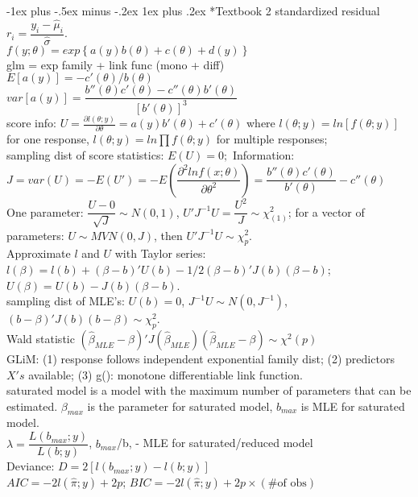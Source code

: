 \documentclass[10pt,landscape]{article}
\makeatletter
\renewcommand{\subsubsection}{\@startsection{subsubsection}{3}{0mm}%
                                {-1ex plus -.5ex minus -.2ex}%
                                {1ex plus .2ex}%
                                {\normalfont\small\bfseries}}
\makeatother
\begin{document}
\begin{multicols}{3}
\subsubsection*{Textbook 2}
\vspace{-5pt}
standardized residual $r_{i}=\dfrac{y_{i}-\hat{\mu}_{i}}{\hat{\sigma}}$. \\
$f\left(y;\theta\right)=exp\left\{ a\left(y\right)b\left(\theta\right)+c\left(\theta\right)+d\left(y\right)\right\} $ \\
glm = exp family + link func (mono + diff)  \\
$E\left[a\left(y\right)\right]=-c'\left(\theta\right)/b\left(\theta\right)$ \\
$var\left[a\left(y\right)\right]=\dfrac{b''\left(\theta\right)c'\left(\theta\right)-c''\left(\theta\right)b'\left(\theta\right)}{\left[b'\left(\theta\right)\right]^{3}}$ \\
score info: $U=\frac{\partial l\left(\theta;y\right)}{\partial\theta}=a\left(y\right)b'\left(\theta\right)+c'\left(\theta\right)$ where $l(\theta;y) = ln[f(\theta; y)]$ for one response, $l(\theta;y) =ln\prod f(\theta; y)$ for multiple responses;\\
sampling dist of score statistics: $E\left(U\right)=0;$ Information: $J=var\left(U\right)=-E\left(U'\right) = -E(\dfrac{\partial^2lnf(x;\theta)}{\partial \theta^2})=\dfrac{b''\left(\theta\right)c'\left(\theta\right)}{b'\left(\theta\right)}-c''\left(\theta\right)$ \\
One parameter: $\dfrac{U-0}{\sqrt{J}} \sim N\left(0,1\right)$, $U'J^{-1}U=\dfrac{U^{2}}{J}\sim\chi_{(1)}^{2}$; for a vector of parameters: $U\sim MVN(0, J)$, then $U'J^{-1}U\sim \chi_p^2$.\\
Approximate $l$ and $U$ with Taylor series: $l(\beta) = l(b) + (\beta - b)'U(b) - 1/2(\beta	- b)'J(b)(\beta	- b)$; $U(\beta	) = U(b) - J(b)(\beta - b)$. \\
sampling dist of MLE's: $U(b) = 0$, $J^{-1}U \sim N(0, J^{-1})$, $(b - \beta)'J(b)(b - \beta) \sim \chi_p^2$. \\
Wald statistic $\left(\hat{\beta}_{MLE}-\beta\right)'J\left(\hat{\beta}_{MLE}\right)\left(\hat{\beta}_{MLE}-\beta\right)\sim\chi^{2}\left(p\right)$\\
GLiM: (1) response follows independent exponential family dist; (2) predictors $X's$ available; (3) g(): monotone differentiable link function.\\
saturated model is a model with the maximum number of parameters that can be estimated. $\beta_{max}$ is the parameter for saturated model, $b_{max}$ is MLE for saturated model.	\\
$\lambda=\dfrac{L\left(b_{max};y\right)}{L\left(b;y\right)}$, $b_{max}$/b, - MLE for saturated/reduced model \\
Deviance: $D=2\left[l\left(b_{max};y\right)-l\left(b;y\right)\right]$ \\
$AIC=-2l\left(\hat{\pi};y\right)+2p$; $BIC=-2l\left(\hat{\pi};y\right)+2p\times\left(\#\text{of obs}\right)$ \\

\end{multicols}
\end{document}
